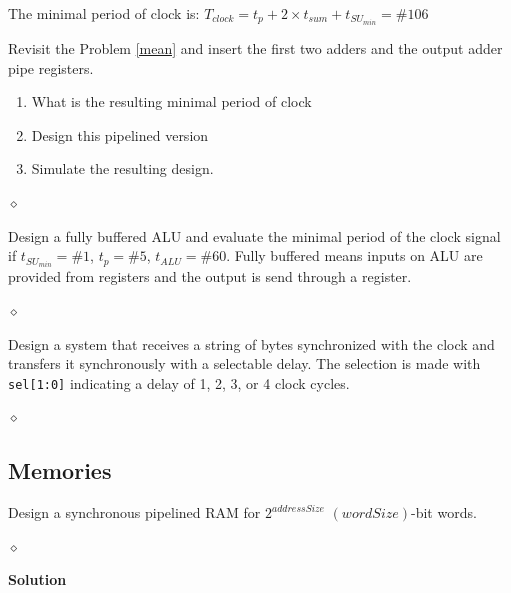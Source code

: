 The minimal period of clock is: $T_{clock} = t_p + 2 \times t_{sum} + t_{SU_{min}} = \#106$

\begin{problem}
Revisit the Problem \ref{mean} and insert the first two adders and the output adder pipe registers.
\begin{enumerate}
    \item What is the resulting minimal period of clock
    \item Design this pipelined version
    \item Simulate the resulting design.
\end{enumerate}

$\diamond$
\end{problem}

\begin{problem}
Design a fully buffered ALU and evaluate the minimal period of the clock signal if $t_{SU_{min}} = \#1$, $t_p = \#5$, $t_{ALU} = \#60$. Fully buffered means inputs on ALU are provided from registers and the output is send through a register.

$\diamond$
\end{problem}

\begin{problem}
Design a system that receives a string of bytes synchronized with the clock and transfers it synchronously with a selectable delay. The selection is made with {\tt sel[1:0]} indicating a delay of 1, 2, 3, or 4 clock cycles.

$\diamond$
\end{problem}

\subsection{Memories}

\begin{problem}
Design a synchronous pipelined RAM for $2^{addressSize}$ $(wordSize)$-bit words.

$\diamond$
\end{problem}

{\bf Solution}


